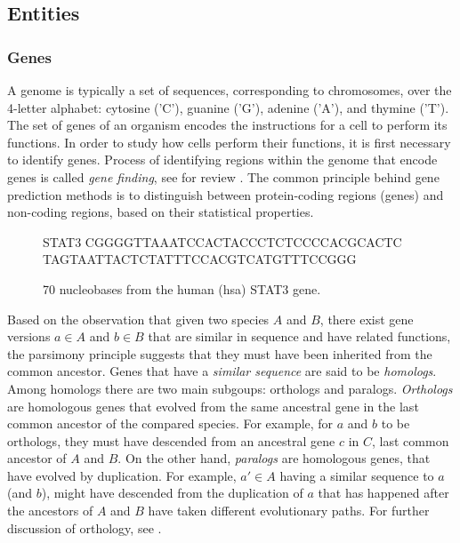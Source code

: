\subsection{Entities}

\subsubsection{Genes}

A genome is typically a set of sequences, corresponding to chromosomes, over the 4-letter alphabet: cytosine ('C'), guanine ('G'), adenine ('A'), and thymine ('T'). The set of genes of an organism encodes the instructions for a cell to perform its functions. In order to study how cells perform their functions, it is first necessary to identify genes. Process of identifying regions within the genome that encode genes is called \emph{gene finding}, see for review \parencite{stormo2000gene}. The common principle behind gene prediction methods is to distinguish between protein-coding regions (genes) and non-coding regions, based on their statistical properties.



\begin{figure}[ht]
  \centering
  \begin{SaveVerbatim}{STAT3}
CGGGGTTAAATCCACTACCCTCTCCCCACGCACTC
TAGTAATTACTCTATTTCCACGTCATGTTTCCGGG
\end{SaveVerbatim}
  \caption{70 nucleobases from the human (hsa) STAT3 gene.}
\end{figure}


Based on the observation that given two species $A$ and $B$, there exist gene versions $a \in A$ and $b \in B$ that are similar in sequence and have related functions, the parsimony principle suggests that they must have been inherited from the common ancestor. Genes that have a  \emph{similar sequence} are said to be \emph{homologs}. Among homologs there are two main subgoups: orthologs and paralogs. \emph{Orthologs} are homologous genes that evolved from the same ancestral gene in the last common ancestor of the compared species. For example, for $a$ and $b$ to be orthologs, they must have descended from an ancestral gene $c$ in $C$, last common ancestor of $A$ and $B$. On the other hand, \emph{paralogs} are homologous genes, that have evolved by duplication. For example, $a' \in A$ having a similar sequence to $a$ (and $b$), might have descended from the duplication of $a$ that has happened after the ancestors of $A$ and $B$ have taken different evolutionary paths. For further discussion of orthology, see \parencites{makarova2007clusters}{kuzniar2008quest}.


